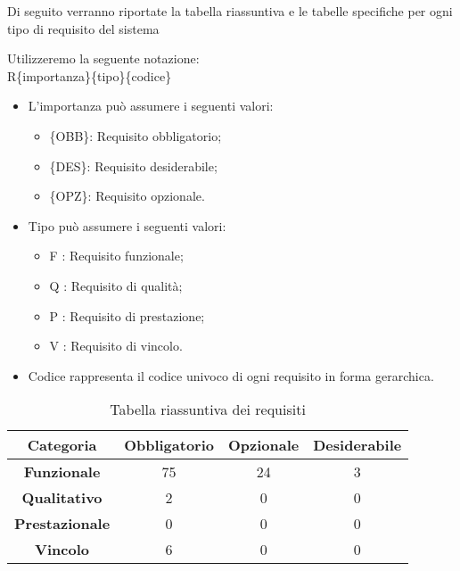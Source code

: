Di seguito verranno riportate la tabella riassuntiva e le tabelle specifiche per ogni tipo di requisito del sistema 

Utilizzeremo la seguente notazione:\\
R\{importanza\}\{tipo\}\{codice\}

\begin{itemize}
	\item L'importanza può assumere i seguenti valori:
	\begin{itemize}
		\item \{OBB\}: Requisito obbligatorio;
		\item \{DES\}: Requisito desiderabile;
		\item \{OPZ\}: Requisito opzionale.
	\end{itemize}
	
	\item Tipo può assumere i seguenti valori:
	\begin{itemize}
		\item {F} : Requisito funzionale;
		\item {Q} : Requisito di qualità;
		\item {P} : Requisito di prestazione;
		\item {V} : Requisito di vincolo.
	\end{itemize}
	
	\item Codice rappresenta il codice univoco di ogni requisito in forma gerarchica.
\end{itemize}


	\begin{table}[h]
		\centering
		\begin{tabular}{|c|c|c|c|}
			\toprule
			
			\textbf{Categoria} & \textbf{Obbligatorio} & \textbf{Opzionale} & \textbf{Desiderabile} \\
			
			\midrule
			\textbf{Funzionale} & 75 & 24 & 3 \\ \midrule
			\textbf{Qualitativo} & 2 & 0 & 0 \\  \midrule
			\textbf{Prestazionale} & 0 & 0 & 0 \\ \midrule
			\textbf{Vincolo} & 6 & 0 & 0  \\ \midrule
			
			\bottomrule
			
		\end{tabular}
		\caption{Tabella riassuntiva dei requisiti}
		
	\end{table}
	\newpage


\newpage


\newpage


\newpage


\newpage

%
